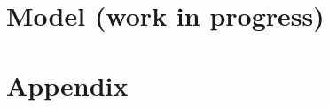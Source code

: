 \documentclass{beamer}
\begin{document}
\section{Model (work in progress)}

	






\section*{Appendix}
\end{document}
